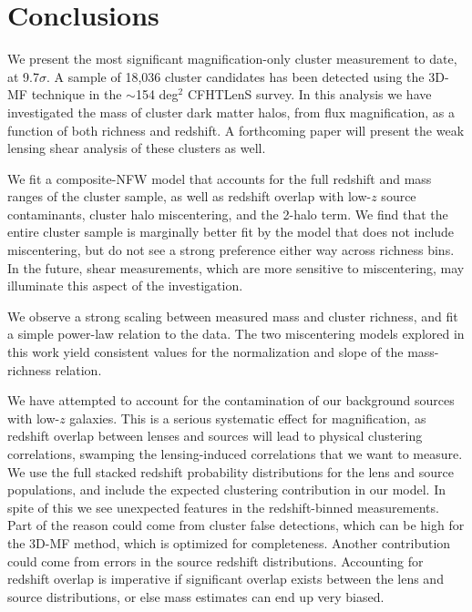 
\section{Conclusions}
\label{sec:conc3}
We present the most significant magnification-only cluster measurement to date, at 9.7$\sigma$. A sample of 18,036 cluster candidates has been detected using the \ac{3D-MF} technique in the $\sim$154 deg$^2$ \ac{CFHTLenS} survey. In this analysis we have investigated the mass of cluster dark matter halos, from flux magnification, as a function of both richness and redshift. A forthcoming paper will present the weak lensing shear analysis of these clusters as well.

We fit a composite-\ac{NFW} model that accounts for the full redshift and mass ranges of the cluster sample, as well as redshift overlap with low-$z$ source contaminants, cluster halo miscentering, and the 2-halo term. We find that the entire cluster sample is marginally better fit by the model that does not include miscentering, but do not see a strong preference either way across richness bins. In the future, shear measurements, which are more sensitive to miscentering, may illuminate this aspect of the investigation.

We observe a strong scaling between measured mass and cluster richness, and fit a simple power-law relation to the data. The two miscentering models explored in this work yield consistent values for the normalization and slope of the mass-richness relation.

We have attempted to account for the contamination of our background sources with low-$z$ galaxies. This is a serious systematic effect for magnification, as redshift overlap between lenses and sources will lead to physical clustering correlations, swamping the lensing-induced correlations that we want to measure. We use the full stacked redshift probability distributions for the lens and source populations, and include the expected clustering contribution in our model. In spite of this we see unexpected features in the redshift-binned measurements. Part of the reason could come from cluster false detections, which can be high for the \ac{3D-MF} method, which is optimized for completeness. Another contribution could come from errors in the source redshift distributions. Accounting for redshift overlap is imperative if significant overlap exists between the lens and source distributions, or else mass estimates can end up very biased.

